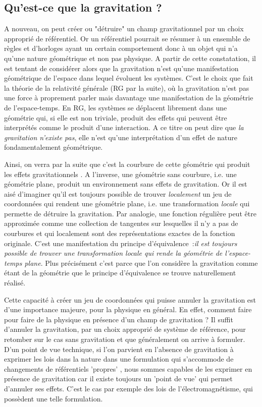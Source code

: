 \subsection{Qu'est-ce que la gravitation ?}
A nouveau, on peut créer ou "détruire" un champ gravitationnel par un choix approprié de référentiel. Or un référentiel pourrait se résumer à un ensemble de règles et d'horloges ayant un certain comportement donc à un objet qui n'a qu'une nature géométrique et non pas physique. A partir de cette constatation, il est tentant de considérer alors que la gravitation n'est qu'une manifestation géométrique de l'espace dans lequel évoluent les systèmes. C'est le choix que fait la théorie de la relativité générale (RG par la suite), où la gravitation n'est pas une force à proprement parler mais davantage une manifestation de la géométrie de l'espace-temps. En RG, les systèmes se déplacent librement dans une géométrie qui, si elle est non triviale, produit des effets qui peuvent être interprétés comme le produit d'une interaction. A ce titre on peut dire que \textit{la gravitation n'existe pas}, elle n'est qu'une interprétation d'un effet de nature fondamentalement géométrique. 

Ainsi, on verra par la suite que c'est la courbure de cette géométrie qui produit les effets gravitationnels . A l'inverse, une géométrie sans courbure, i.e. une géométrie plane, produit un environnement sans effets de gravitation. Or il est aisé d'imaginer qu'il est toujours possible de trouver \textit{localement} un jeu de coordonnées qui rendent une géométrie plane, i.e. une transformation \textit{locale} qui permette de détruire la gravitation. Par analogie, une fonction régulière peut être approximée comme une collection de tangentes sur lesquelles il n'y a pas de courbures et qui localement sont des représentations exactes de la fonction originale. C'est une manifestation du principe d'équivalence~:\textit{il est toujours possible de trouver une transformation locale qui rende la géométrie de l'espace-temps plane}. Plus précisément c'est parce que l'on considère la gravitation comme étant de la géométrie que le principe d'équivalence se trouve naturellement réalisé.

Cette capacité à créer un jeu de coordonnées qui puisse annuler la gravitation est d'une importance majeure, pour la physique en général. En effet, comment faire pour faire de la physique en présence d'un champ de gravitation ? Il suffit d'annuler la gravitation, par un choix approprié de système de référence, pour retomber sur le cas sans gravitation et que généralement on arrive à formuler. D'un point de vue technique, si l'on parvient en l'absence de gravitation à exprimer les lois dans la nature dans une formulation qui s'accommode de changements de référentiels 'propres' , nous sommes capables de les exprimer en présence de gravitation car il existe toujours un 'point de vue' qui permet d'annuler ses effets. C'est le cas par exemple des lois de l'électromagnétisme, qui possèdent une telle formulation.

